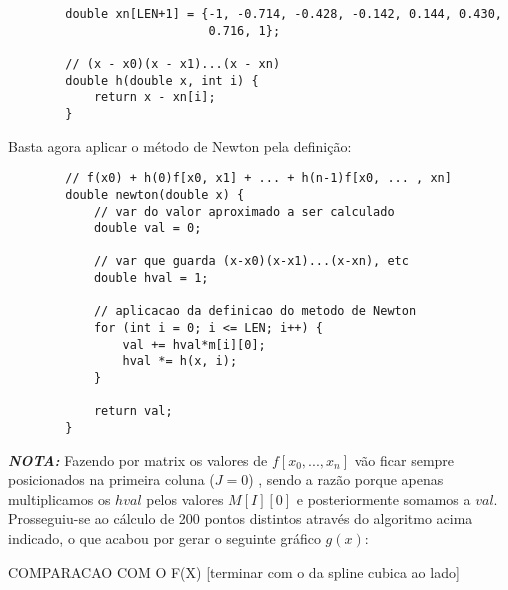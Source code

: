 \documentclass[12pt, letterpaper]{article}
\begin{document}
\begin{itemize}
    \begin{verbatim}
        double xn[LEN+1] = {-1, -0.714, -0.428, -0.142, 0.144, 0.430, 
                            0.716, 1};
                            
        // (x - x0)(x - x1)...(x - xn)
        double h(double x, int i) {
            return x - xn[i];
        }
    \end{verbatim}

    Basta agora aplicar o método de Newton pela definição:

    \begin{verbatim}
        // f(x0) + h(0)f[x0, x1] + ... + h(n-1)f[x0, ... , xn]
        double newton(double x) {
            // var do valor aproximado a ser calculado
            double val = 0;
        
            // var que guarda (x-x0)(x-x1)...(x-xn), etc
            double hval = 1;
        
            // aplicacao da definicao do metodo de Newton
            for (int i = 0; i <= LEN; i++) {
                val += hval*m[i][0];
                hval *= h(x, i);
            }
            
            return val;
        }
    \end{verbatim}

    \textbf{\textit{NOTA:}} Fazendo por matrix os valores de $f[x_0, ... , x_n]$ vão ficar sempre posicionados na primeira coluna ($J=0$) , sendo a razão porque apenas multiplicamos os $hval$ pelos valores $M[I][0]$ e posteriormente somamos a $val$. \\

    Prosseguiu-se ao cálculo de 200 pontos distintos através do algoritmo acima indicado, o que acabou por gerar o seguinte gráfico $g(x)$:

    \begin{quote}
        \centering
    \end{quote}

    COMPARACAO COM O F(X) [terminar com o da spline cubica ao lado]

    \begin{quote}
        \centering
    \end{quote}
    
\end{itemize}
\end{document}
